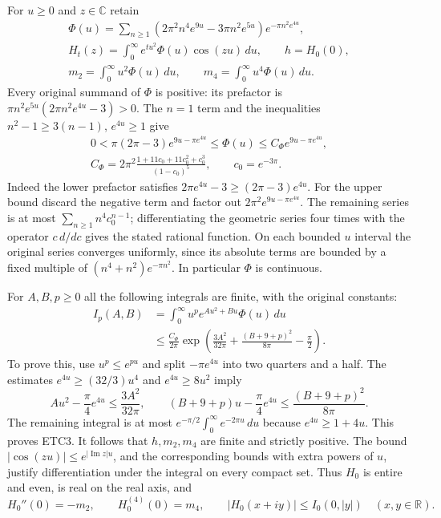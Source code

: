 For $u\ge0$ and $z\in\mathbb C$ retain
\begin{equation}\tag{ETC1}
\begin{gathered}
 \Phi(u)=\sum_{n\ge1}
 (2\pi^2n^4e^{9u}-3\pi n^2e^{5u})e^{-\pi n^2e^{4u}},\\
 H_t(z)=\int_0^\infty e^{tu^2}\Phi(u)\cos(zu)\,du,
 \qquad h=H_0(0),\\
 m_2=\int_0^\infty u^2\Phi(u)\,du,\qquad
 m_4=\int_0^\infty u^4\Phi(u)\,du.
\end{gathered}
\end{equation}
Every original summand of $\Phi$ is positive: its prefactor
is $\pi n^2e^{5u}(2\pi n^2e^{4u}-3)>0$. The $n=1$ term
and the inequalities $n^2-1\ge3(n-1)$, $e^{4u}\ge1$ give
\begin{equation}\tag{ETC2}
\begin{gathered}
 0<\pi(2\pi-3)e^{9u-\pi e^{4u}}
       \le\Phi(u)\le C_\Phi e^{9u-\pi e^{4u}},\\
 C_\Phi=2\pi^2\frac{1+11c_0+11c_0^2+c_0^3}{(1-c_0)^5},
 \qquad c_0=e^{-3\pi}.
\end{gathered}
\end{equation}
Indeed the lower prefactor satisfies
$2\pi e^{4u}-3\ge(2\pi-3)e^{4u}$. For the upper bound
discard the negative term and factor out
$2\pi^2e^{9u-\pi e^{4u}}$. The remaining series is at most
$\sum_{n\ge1}n^4c_0^{n-1}$; differentiating the geometric
series four times with the operator $c\,d/dc$ gives the
stated rational function. On each bounded $u$ interval the
original series converges uniformly, since its absolute
terms are bounded by a fixed multiple of
$(n^4+n^2)e^{-\pi n^2}$. In particular $\Phi$ is continuous.

For $A,B,p\ge0$ all the following integrals are finite,
with the original constants:
\begin{equation}\tag{ETC3}
\begin{split}
 I_p(A,B)&=\int_0^\infty u^pe^{Au^2+Bu}\Phi(u)\,du\\
 &\le\frac{C_\Phi}{2\pi}
 \exp\left(\frac{3A^2}{32\pi}
       +\frac{(B+9+p)^2}{8\pi}-\frac\pi2\right).
\end{split}
\end{equation}
To prove this, use $u^p\le e^{pu}$ and split
$-\pi e^{4u}$ into two quarters and a half. The estimates
$e^{4u}\ge(32/3)u^4$ and $e^{4u}\ge8u^2$ imply
\[
 Au^2-\frac\pi4e^{4u}\le\frac{3A^2}{32\pi},\qquad
 (B+9+p)u-\frac\pi4e^{4u}
          \le\frac{(B+9+p)^2}{8\pi}.
\]
The remaining integral is at most
$e^{-\pi/2}\int_0^\infty e^{-2\pi u}\,du$
because $e^{4u}\ge1+4u$. This proves ETC3.
It follows that $h,m_2,m_4$ are finite and strictly positive.
The bound $|\cos(zu)|\le e^{|\operatorname{Im}z|u}$,
and the corresponding bounds with extra powers of $u$,
justify differentiation under the integral on every compact
set. Thus $H_0$ is entire and even, is real on the real axis,
and
\begin{equation}\tag{ETC4}
 H_0''(0)=-m_2,\qquad H_0^{(4)}(0)=m_4,\qquad
 |H_0(x+iy)|\le I_0(0,|y|)\quad(x,y\in\mathbb R).
\end{equation}


